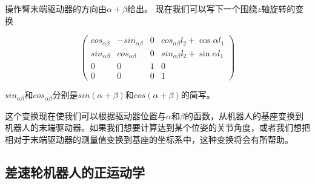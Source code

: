 
操作臂末端驱动器的方向由$\alpha+\beta$给出。 现在我们可以写下一个围绕$z$轴旋转的变换

\begin{equation}
\label{eq:2armtrans}
\left(\begin{array}{llll}cos_{\alpha\beta} & -sin_{\alpha\beta} &  0 & cos_{\alpha\beta}l_2+\cos\alpha l_1\\
                        sin_{\alpha\beta} & cos_{\alpha\beta} & 0 & sin_{\alpha\beta}l_2+\sin\alpha l_1\\
												0 & 0 & 1 & 0\\
												0 & 0 & 0 & 1\end{array}\right)
\end{equation}


$sin_{\alpha \beta}$和$cos_{\alpha \beta}$分别是$sin(\alpha+\beta)$和$cos(\alpha+\beta)$的简写。


这个变换现在使我们可以根据驱动器位置与$\alpha$和$\beta$的函数，从机器人的基座变换到机器人的末端驱动器。如果我们想要计算达到某个位姿的关节角度，或者我们想把相对于末端驱动器的测量值变换到基座的坐标系中，这种变换将会有所帮助。

\subsection{差速轮机器人的正运动学}
\label{sec:fwkmobile}


